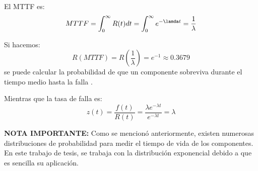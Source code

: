 El \ac{MTTF} es: $$MTTF = \int_0^\infty R(t)dt = \int_0^\infty e^{-\lamda t} = \frac{1}{\lambda}$$

Si hacemos: $$R(MTTF) = R(\frac{1}{\lambda}) = e^{-1}\approx 0.3679$$  se puede calcular la probabilidad de que un componente sobreviva durante el
tiempo medio hasta la falla \citep{Rausand04}.

Mientras que la tasa de falla es: $$z(t) = \frac{f(t)}{R(t)} = \frac{\lambda e^{-\lambda t}}{e^{-\lambda t}} = \lambda $$

\textbf{NOTA IMPORTANTE:} Como se mencionó anteriormente, existen numerosas distribuciones
de probabilidad para medir el tiempo de vida de los componentes. En este trabajo de tesis,
se trabaja con la distribución exponencial debido a que es sencilla su aplicación.
